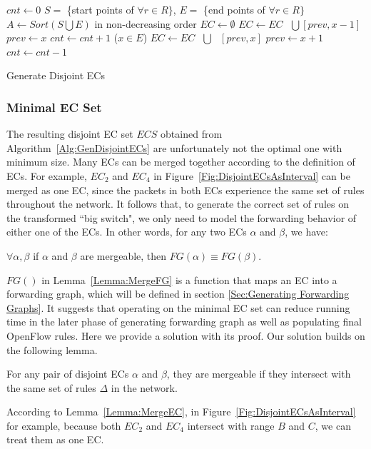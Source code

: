 \begin{algorithm}[t]
\DontPrintSemicolon
{}
$cnt \gets 0$\;
$S = $ \{start points of $\forall r \in R\}$, $E = $ \{end points of $\forall r \in R\}$\;
$A \gets Sort(S \bigcup E)$ in non-decreasing order\;
$EC \gets \emptyset$\;
 {
         {
                 {\label{Alg:LineEndStart1} 
                        $EC \gets EC \text{ }\bigcup \text{} [prev, x-1]$\;
                }\label{Alg:LineEndStart2} 
                $prev \gets x$\;\label{Alg:LineNewPrev1}
                $cnt \gets cnt + 1$\;
        }
        \Else ($x \in E$) {
                $EC \gets EC \text{ } \bigcup \text{ } [prev, x]$\;\label{Alg:LineEndEnd}
                $prev \gets x + 1$\;\label{Alg:LineNewPrev2}
                $cnt \gets cnt - 1$\;
        }
}
\caption{Generate Disjoint ECs\label{Alg:GenDisjointECs}}
\end{algorithm}

\subsubsection{Minimal EC Set}
The resulting disjoint EC set $ECS$ obtained from Algorithm~\ref{Alg:GenDisjointECs} are unfortunately not the optimal one with minimum size.
Many ECs can be merged together according to the definition of ECs.
For example, $EC_2$ and $EC_4$ in Figure~\ref{Fig:DisjointECsAsInterval} can be merged as one EC, since the packets in both ECs experience the same set of rules throughout the network. It follows that, to generate the correct set of rules on the transformed ``big switch", we only need to model the forwarding behavior of either one of the ECs. In other words, for any two ECs $\alpha$ and $\beta$, we have:
\begin{lemma}
$\forall \alpha, \beta $ if $\alpha$ and $\beta$ are mergeable, then $FG(\alpha) \equiv FG(\beta)$.
\label{Lemma:MergeFG}
\end{lemma}
$FG()$ in Lemma~\ref{Lemma:MergeFG} is a function that maps an EC into a forwarding graph, which will be defined in section \ref{Sec:Generating Forwarding Graphs}. It suggests that operating on the minimal EC set can
reduce running time in the later phase of generating forwarding graph
as well as populating final OpenFlow rules.
Here we provide a solution with its proof.
Our solution builds on the following lemma.
\begin{lemma}
For any pair of disjoint ECs $\alpha$ and $\beta$, they are mergeable
if they intersect with the same set of rules $\Delta$ in the network.
\label{Lemma:MergeEC}
\end{lemma}
According to Lemma~\ref{Lemma:MergeEC}, in Figure~\ref{Fig:DisjointECsAsInterval} for example,
because both $EC_2$ and $EC_4$ intersect with range $B$ and $C$, we can treat them as one EC.

